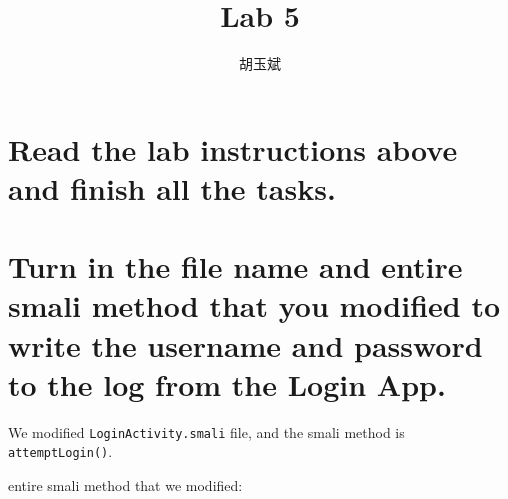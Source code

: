 \documentclass[onecolumn,oneside]{SUSTechHomework}
\author{胡玉斌}
\title{Lab 5}
\begin{document}
  \maketitle

  \section{Read the lab instructions above and finish all the tasks.}

  \section{Turn in the file name and entire smali method that you modified to write the username and password to the log from the Login App.}

    We modified \verb|LoginActivity.smali| file, and the smali method is \verb|attemptLogin()|.

    entire smali method that we modified:
\end{document}
